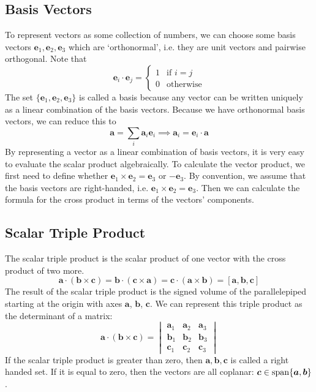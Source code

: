\documentclass{article}
\begin{document}
\subsection{Basis Vectors}
To represent vectors as some collection of numbers, we can choose some basis vectors $\bm e_1, \bm e_2, \bm e_3$ which are `orthonormal', i.e. they are unit vectors and pairwise orthogonal. Note that
\[ \bm e_i \cdot \bm e_j = \begin{cases}
		1 & \text{if } i = j \\
		0 & \text{otherwise}
	\end{cases} \]
The set $\{ \bm e_1, \bm e_2, \bm e_3 \}$ is called a basis because any vector can be written uniquely as a linear combination of the basis vectors. Because we have orthonormal basis vectors, we can reduce this to
\[ \bm a = \sum_i \bm a_i \bm e_i \implies \bm a_i = \bm e_i \cdot \bm a \]
By representing a vector as a linear combination of basis vectors, it is very easy to evaluate the scalar product algebraically. To calculate the vector product, we first need to define whether $\bm e_1 \times \bm e_2 = \bm e_3$ or $-\bm e_3$. By convention, we assume that the basis vectors are right-handed, i.e. $\bm e_1 \times \bm e_2 = \bm e_3$. Then we can calculate the formula for the cross product in terms of the vectors' components.

\subsection{Scalar Triple Product}
The scalar triple product is the scalar product of one vector with the cross product of two more.
\[ \bm a \cdot (\bm b \times \bm c) = \bm b \cdot (\bm c \times \bm a) = \bm c \cdot (\bm a \times \bm b) = [\bm a, \bm b, \bm c] \]
The result of the scalar triple product is the signed volume of the parallelepiped starting at the origin with axes $\bm a$, $\bm b$, $\bm c$. We can represent this triple product as the determinant of a matrix:
\[
	\bm a \cdot (\bm b \times \bm c) =
	\begin{vmatrix}
		\bm a_1 & \bm a_2 & \bm a_3 \\
		\bm b_1 & \bm b_2 & \bm b_3 \\
		\bm c_1 & \bm c_2 & \bm c_3
	\end{vmatrix}
\]
If the scalar triple product is greater than zero, then $\bm a, \bm b, \bm c$ is called a right handed set. If it is equal to zero, then the vectors are all coplanar: $\bm c \in \operatorname{span} \{ \bm a, \bm b \}$.
\end{document}
